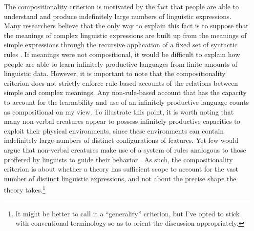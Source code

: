 The compositionality criterion is motivated by the fact that people are able to understand and produce indefinitely large numbers of linguistic expressions. Many researchers believe that the only way to explain this fact is to suppose that the meanings of complex linguistic expressions are built up from the meanings of simple expressions through the recursive application of a fixed set of syntactic rules \citep{Szabo:2012,Szabo:2013,FodorLepore:1991,Recanati:2012,Unnsteinsson:2014,Pinker:1994,FodorPylyshyn:1988,CappelenLepore:2005}. If meanings were not compositional, it would be difficult to explain how people are able to learn infinitely productive languages from finite amounts of linguistic data. However, it is important to note that the compositionality criterion does not strictly enforce rule-based accounts of the relations between simple and complex meanings. Any non-rule-based account that has the capacity to account for the learnability and use of an infinitely productive language counts as compositional on my view. To illustrate this point, it is worth noting that many non-verbal creatures appear to possess infinitely productive capacities to exploit their physical environments, since these environments can contain indefinitely large numbers of distinct configurations of features. Yet few would argue that non-verbal creatures make use of a system of rules analogous to those proffered by linguists to guide their behavior \citep[cf.][]{FodorPylyshyn:1988}. As such, the compositionality criterion is about whether a theory has sufficient scope to account for the vast number of distinct linguistic expressions, and not about the precise shape the theory takes.\footnote{It might be better to call it a ``generality'' criterion, but I've opted to stick with conventional terminology so as to orient the discussion appropriately.}

